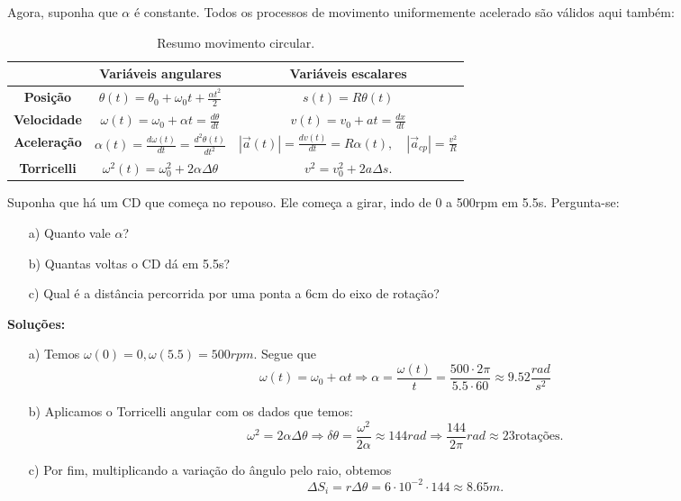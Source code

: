 \documentclass[PhysicsII/physicsII_notes.tex]{subfiles}
\begin{document}
Agora, suponha que \(\alpha \) é constante. Todos os processos de movimento uniformemente acelerado são válidos aqui também:
\begin{table}[h!]
	\centering
	\begin{tabular}{|c|c|c|}
		\hline
		                    & \textbf{Variáveis angulares}                                    & \textbf{Variáveis escalares}                                                        \\
		\hline
		\textbf{Posição}    & $\theta(t) = \theta_{0} + \omega_{0}t + \frac{\alpha t^{2}}{2}$ & $s(t) = R\theta(t)$                                                                 \\
		\hline
		\textbf{Velocidade} & $\omega(t) = \omega_{0} + \alpha t = \frac{d\theta }{dt}$       & $v(t) = v_{0} + at = \frac{dx}{dt}$                                                 \\
		\hline
		\textbf{Aceleração} & $\alpha(t) = \frac{d\omega(t)}{dt} = \frac{d^2\theta(t)}{dt^2}$ & $|\vec{a}(t)| = \frac{dv(t)}{dt} = R\alpha(t),\quad |\vec{a}_{cp}| = \frac{v^2}{R}$ \\
		\hline
		\textbf{Torricelli} & $\omega^{2}(t) = \omega_{0}^{2} + 2\alpha \Delta \theta $       & $v^{2} = v_{0}^{2} + 2a\Delta s.$                                                   \\
		\hline
	\end{tabular}
	\caption{Resumo movimento circular.}
	\label{tab:my_label}
\end{table}

\begin{example}
	Suponha que há um CD que começa no repouso. Ele começa a girar, indo de 0 a 500rpm em 5.5s. Pergunta-se:
	\begin{itemize}
		\item[a)] Quanto vale \(\alpha \)?
		\item[b)] Quantas voltas o CD dá em 5.5s?
		\item[c)] Qual é a distância percorrida por uma ponta a 6cm do eixo de rotação?
	\end{itemize}

	\textbf{Soluções:}
	\begin{itemize}
		\item[a)] Temos \(\omega (0) = 0, \omega (5.5) = 500rpm.\) Segue que
		      \[
			      \omega(t) = \omega_{0} + \alpha t \Rightarrow \alpha  = \frac{\omega (t)}{t} = \frac{500 \cdot 2\pi}{5.5 \cdot 60}\approx 9.52 \frac{rad}{s^{2}}
		      \]

		\item[b)] Aplicamos o Torricelli angular com os dados que temos:
		      \[
			      \omega^{2} = 2\alpha \Delta \theta \Rightarrow \delta \theta = \frac{\omega^{2}}{2\alpha }\approx 144 rad \Rightarrow \frac{144}{2\pi}rad\approx 23\text{rotações}.
		      \]

		\item[c)] Por fim, multiplicando a variação do ângulo pelo raio, obtemos
		      \[
			      \Delta S_{i} = r\Delta \theta = 6 \cdot 10^{-2}\cdot 144\approx 8.65m.
		      \]
	\end{itemize}
\end{example}
\end{document}
